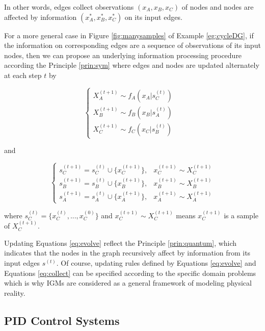 \documentclass{article}
\theoremstyle{definition}
\theoremstyle{remark}
\theoremstyle{definition}
\begin{document}
\begin{CJK*}{UTF8}{gbsn}
In other words, edges collect observations $(x_A, x_B, x_C)$ of nodes and nodes are affected by information $(x_A^*, x_B^*, x_C^*)$ on its input edges. 

For a more general case in Figure \ref{fig:manysamples} of Example \ref{eg:cycleDG}, if the information on corresponding edges are a sequence of observations of its input nodes, then we can propose an underlying information processing procedure according the Principle \ref{prin:sym} where edges and nodes are updated alternately at each step $t$ by

\begin{equation} \label{eq:evolve}
\left\{
     \begin{array}{lr}
     X_A^{(t+1)} \sim f_A(x_A|s_{C}^{(t)}) &  \\
     X_B^{(t+1)} \sim f_B(x_B|s_{A}^{(t)}) & \\
     X_C^{(t+1)} \sim f_C(x_C|s_{B}^{(t)}) &  
     \end{array}
\right.
\end{equation}

and 

\begin{equation} \label{eq:collect}
\left\{
     \begin{array}{lr}
     s^{(t+1)}_C = s^{(t)}_C \cup \{x_C^{(t+1)}\}, & x_C^{(t+1)} \sim X_C^{(t+1)} \\
     s^{(t+1)}_B = s^{(t)}_B \cup \{x_B^{(t+1)}\}, & x_B^{(t+1)} \sim X_B^{(t+1)} \\
     s^{(t+1)}_A = s^{(t)}_A \cup \{x_A^{(t+1)}\}, & x_A^{(t+1)} \sim X_A^{(t+1)}  
     \end{array}
\right.
\end{equation}

where $s_{C}^{(t)} = \{x^{(t)}_C, ..., x^{(0)}_C\}$ and $x_C^{(t+1)} \sim X_C^{(t+1)}$ means $x_C^{(t+1)}$ is a sample of $X_C^{(t+1)}$. 

Updating Equations \ref{eq:evolve} reflect the Principle \ref{prin:quantum}, which indicates that the nodes in the graph recursively affect by information from its input edges $s^{(t)}$. Of course, updating rules defined by Equations \ref{eq:evolve} and Equations \ref{eq:collect} can be specified according to the specific domain problems which is why IGMs are considered as a general framework of modeling physical reality. 

\subsection{PID Control Systems}


\end{CJK*}
\end{document}
